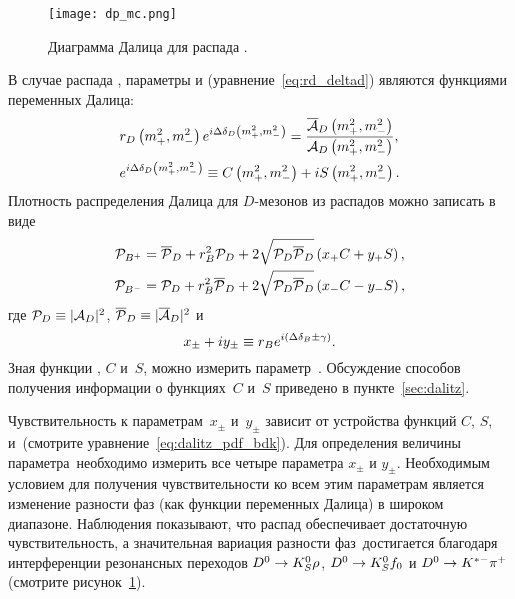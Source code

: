 \begin{figure}[htb]
 \centering
  \texttt{[image: dp\_mc.png]}
 \caption{Диаграмма Далица для распада \dbkpp.}
 \label{fig:kspp_dalitz}
\end{figure}

В случае распада \dkpp, параметры \rd и \deld (уравнение~\eqref{eq:rd_deltad}) являются функциями переменных Далица:
\begin{equation}
\begin{split}
 &r_D\left(m_+^2,m_-^2\right) e^{i\Delta\delta_D\left(m_+^2,m_-^2\right)} = \frac{\overline{\mathcal{A}}_D\left(m_+^2,m_-^2\right)}{\mathcal{A}_D\left(m_+^2,m_-^2\right)},\\
 & e^{i\Delta\delta_D\left(m_+^2,m_-^2\right)} \equiv C\left(m_+^2,m_-^2\right) + iS\left(m_+^2,m_-^2\right).
\end{split}
\end{equation}
Плотность распределения Далица для $D$-мезонов из распадов \bdk можно записать в виде
\begin{equation}\label{eq:dalitz_pdf_bdk}
\begin{split}
 \mathcal{P}_{B^+} &= \overline{\mathcal{P}}_D + r_B^2\mathcal{P}_D    + 2\sqrt{\mathcal{P}_D\overline{\mathcal{P}}_D}\left(x_+C + y_+S\right),\\
 \mathcal{P}_{B^-} &= \mathcal{P}_D    + r_B^2\overline{\mathcal{P}}_D + 2\sqrt{\mathcal{P}_D\overline{\mathcal{P}}_D}\left(x_-C - y_-S\right),
\end{split}
\end{equation}
где $\mathcal{P}_D\equiv|\mathcal{A}_D|^2$, $\overline{\mathcal{P}}_D\equiv|\overline{\mathcal{A}}_D|^2$ и
\begin{equation}\label{eq:xy}
 x_{\pm} + iy_{\pm} \equiv r_B e^{i\left(\Delta\delta_B\pm\gamma\right)}.
\end{equation}
Зная функции \mcpd, $C$ и~$S$, можно измерить параметр~\gphi.  Обсуждение способов получения информации о функциях~$C$ и~$S$ приведено в пункте~\ref{sec:dalitz}.  

Чувствительность к параметрам~$x_{\pm}$ и~$y_{\pm}$ зависит от устройства функций $C$, $S$, \mcpd и~\mcpdbar (смотрите уравнение~\eqref{eq:dalitz_pdf_bdk}).  Для определения величины параметра~\gphi необходимо измерить все четыре параметра $x_{\pm}$ и $y_{\pm}$.  Необходимым условием для получения чувствительности ко всем этим параметрам является изменение разности фаз \deld (как функции переменных Далица) в широком диапазоне.  Наблюдения показывают, что распад \dnkpp обеспечивает достаточную чувствительность, а значительная вариация разности фаз~\deld достигается благодаря интерференции резонансных переходов $D^0\to K_S^0\rho$, $D^0\to K_S^0 f_0$ и $D^0\to K^{*-}\pi^+$ (смотрите рисунок~\ref{fig:kspp_dalitz}).  

